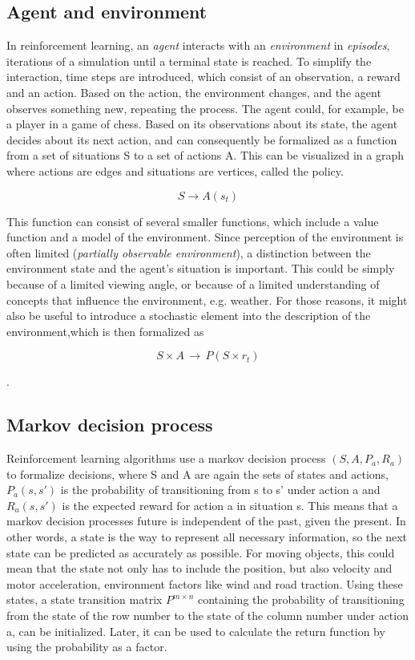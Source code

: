 \documentclass[12pt,a4]{article}
\begin{document}
\subsection{Agent and environment}
In reinforcement learning, an \emph{agent} interacts with an \emph{environment} in \emph{episodes}, iterations of a simulation until a terminal state is reached. To simplify the interaction, time steps are introduced, which consist of an observation, a reward and an action. Based on the action, the environment changes, and the agent observes something new, repeating the process. The agent could, for example, be a player in a game of chess. Based on its observations about its state, the agent decides about its next action, and can consequently be formalized as a function from a set of situations S to a set of actions A. This can be visualized in a graph where actions are edges and situations are vertices, called the policy.

\[S \rightarrow A(s_{t})\]


This function can consist of several smaller functions, which include a value function and a model of the environment. Since perception of the environment is often limited (\emph{partially observable environment}), a distinction between the environment state and the agent's situation is important. This could be simply because of a limited viewing angle, or because of a limited understanding of concepts that influence the environment, e.g. weather.
For those reasons, it might also be useful to introduce a stochastic element into the description of the environment,which is then formalized as

\[S \times A \,\rightarrow \,P(S \times r_{t})\]

.\citep{KrieselKNN}

\subsection{Markov decision process}
Reinforcement learning algorithms use a markov decision process \((S,A,P_{a},R_{a})\) to formalize decisions, where S and A are again the sets of states and actions, \(P_{a}(s,s')\) is the probability of transitioning from s to s' under action a and \(R_{a}(s,s')\) is the expected reward for action a in situation s. This means that a markov decision processes future is independent of the past, given the present. In other words, a state is the way to represent all necessary information, so the next state can be predicted as accurately as possible. For moving objects, this could mean that the state not only has to include the position, but also velocity and motor acceleration, environment factors like wind and road traction. Using these states, a state transition matrix \(P^{m \times n}\) containing the probability of transitioning from the state of the row number to the state of the column number under action a, can be initialized. Later, it can be used to calculate the return function by using the probability as a factor.\citep{wikiMarkov}
\end{document}
